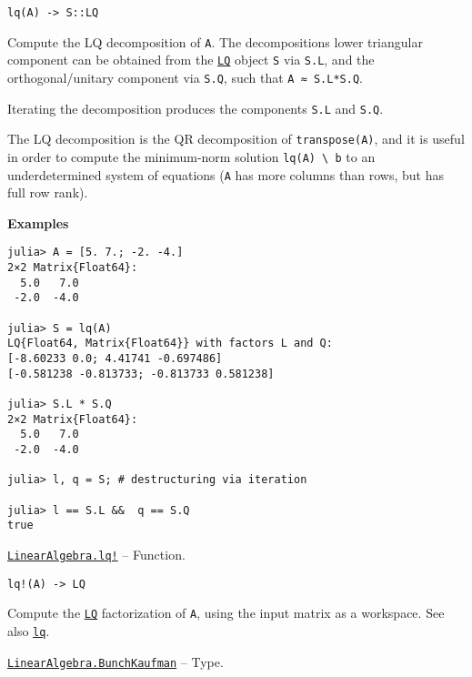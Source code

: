 \begin{adjustwidth}{2em}{0pt}


\begin{verbatim}
lq(A) -> S::LQ
\end{verbatim}

Compute the LQ decomposition of \texttt{A}. The decomposition{\textquotesingle}s lower triangular component can be obtained from the \hyperlink{15372856222060015568}{\texttt{LQ}} object \texttt{S} via \texttt{S.L}, and the orthogonal/unitary component via \texttt{S.Q}, such that \texttt{A ≈ S.L*S.Q}.

Iterating the decomposition produces the components \texttt{S.L} and \texttt{S.Q}.

The LQ decomposition is the QR decomposition of \texttt{transpose(A)}, and it is useful in order to compute the minimum-norm solution \texttt{lq(A) {\textbackslash} b} to an underdetermined system of equations (\texttt{A} has more columns than rows, but has full row rank).

\textbf{Examples}


\begin{verbatim}
julia> A = [5. 7.; -2. -4.]
2×2 Matrix{Float64}:
  5.0   7.0
 -2.0  -4.0

julia> S = lq(A)
LQ{Float64, Matrix{Float64}} with factors L and Q:
[-8.60233 0.0; 4.41741 -0.697486]
[-0.581238 -0.813733; -0.813733 0.581238]

julia> S.L * S.Q
2×2 Matrix{Float64}:
  5.0   7.0
 -2.0  -4.0

julia> l, q = S; # destructuring via iteration

julia> l == S.L &&  q == S.Q
true
\end{verbatim}



\end{adjustwidth}
\hypertarget{11794326565026371502}{}
\hyperlink{11794326565026371502}{\texttt{LinearAlgebra.lq!}}  -- {Function.}

\begin{adjustwidth}{2em}{0pt}


\begin{verbatim}
lq!(A) -> LQ
\end{verbatim}

Compute the \hyperlink{15372856222060015568}{\texttt{LQ}} factorization of \texttt{A}, using the input matrix as a workspace. See also \hyperlink{1096124289761034610}{\texttt{lq}}.



\end{adjustwidth}
\hypertarget{10272627787201613275}{}
\hyperlink{10272627787201613275}{\texttt{LinearAlgebra.BunchKaufman}}  -- {Type.}

